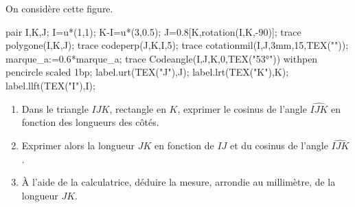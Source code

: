 \begin{exercice*}
    On considère cette figure.

    \begin{center}
        \begin{Geometrie}
            pair I,K,J;
            I=u*(1,1);
            K-I=u*(3,0.5);
            J=0.8[K,rotation(I,K,-90)];
            trace polygone(I,K,J);
            trace codeperp(J,K,I,5);
            trace cotationmil(I,J,3mm,15,TEX(""));
            marque_a:=0.6*marque_a;                
            trace Codeangle(I,J,K,0,TEX("\ang{53}")) withpen pencircle scaled 1bp;
            label.urt(TEX("J"),J);
            label.lrt(TEX("K"),K);
            label.llft(TEX("I"),I);
        \end{Geometrie}
    \end{center}
    \begin{enumerate}
        \item Dans le triangle $IJK$, rectangle en $K$, exprimer le cosinus de l'angle $\widehat{IJK}$ en fonction des longueurs des côtés.
        \item Exprimer alors la longueur $JK$ en fonction de $IJ$ et du cosinus de l'angle $\widehat{IJK}$.
        \item À l'aide de la calculatrice, déduire la mesure, arrondie au millimètre, de la longueur $JK$.
    \end{enumerate}
\end{exercice*}
